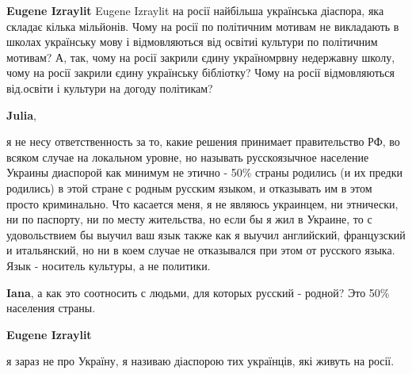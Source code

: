 \begin{itemize}
\begin{itemize}
 
\textbf{Eugene Izraylit} Eugene Izraylit на росії найбільша українська
діаспора, яка складає кілька мільйонів. Чому на росії по політичним мотивам не
викладають в школах українську мову і відмовляються від освітиі культури по
політичним мотивам? А, так, чому на росії закрили єдину україномрвну недержавну
школу, чому на росії закрили єдину українську бібліотку? Чому на росії
відмовляються від.освіти і культури на догоду політикам?

 
\textbf{Julia}, 

я не несу ответственность за то, какие решения принимает правительство РФ, во
всяком случае на локальном уровне, но называть русскоязычное население Украины
диаспорой как минимум не этично - 50\% страны родились (и их предки родились) в
этой стране с родным русским языком, и отказывать им в этом просто криминально.
Что касается меня, я не являюсь украинцем, ни этнически, ни по паспорту, ни по
месту жительства, но если бы я жил в Украине, то с удовольствием бы выучил ваш
язык также как я выучил английский, французский и итальянский, но ни в коем
случае не отказывался при этом от русского языка. Язык - носитель культуры, а
не политики.


 
\textbf{Iana}, а как это соотносить с людьми, для которых русский - родной? Это 50\% населения страны.

 
\textbf{Eugene Izraylit} 

я зараз не про Україну, я називаю діаспорою тих українців, які живуть на росії.


\end{itemize}
\end{itemize}
